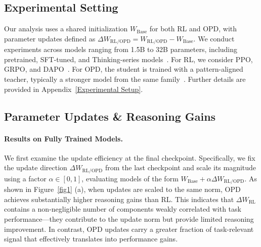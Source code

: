 \documentclass{llmxive}
\begin{document}
\subsection{Experimental Setting}
\label{Experimental Setting}
Our analysis uses a shared initialization $W_{\mathrm{Base}}$ for both RL and OPD, with parameter updates defined as $\Delta W_{\mathrm{RL/OPD}} = W_{\mathrm{RL/OPD}} - W_{\mathrm{Base}}$. We conduct experiments across models ranging from 1.5B to 32B parameters, including pretrained, SFT-tuned, and Thinking-series models~\citep{qwen2025qwen25technicalreport,zhang2025instructiontuninglargelanguage,yang2025qwen3technicalreport}. For RL, we consider PPO, GRPO, and DAPO~\citep{yu2025dapoopensourcellmreinforcement}. For OPD, the student is trained with a pattern-aligned teacher, typically a stronger model from the same family~\citep{li2026rethinking}. Further details are provided in Appendix~\ref{Experimental Setup}.

\subsection{Parameter Updates \& Reasoning Gains}
\label{Parameter Updates and Reasoning Gains}

\paragraph{Results on Fully Trained Models.}
We first examine the update efficiency at the final checkpoint. Specifically, we fix the update direction $\Delta W_{\mathrm{RL/OPD}}$ from the last checkpoint and scale its magnitude using a factor $\alpha \in [0,1]$, evaluating models of the form $W_{\mathrm{Base}} + \alpha \Delta W_{\mathrm{RL/OPD}}$. As shown in Figure~\ref{fig1} (a), when updates are scaled to the same norm, OPD achieves substantially higher reasoning gains than RL. This indicates that $\Delta W_{\mathrm{RL}}$ contains a non-negligible number of components weakly correlated with task performance—they contribute to the update norm but provide limited reasoning improvement. In contrast, OPD updates carry a greater fraction of task-relevant signal that effectively translates into performance gains.
\end{document}
